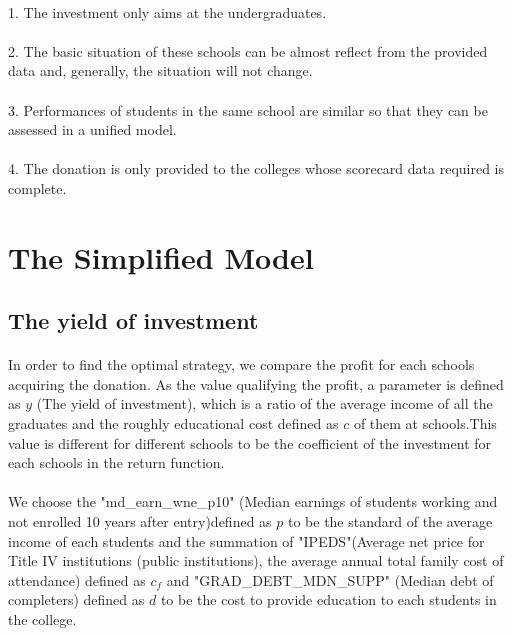 \documentclass{mcmthesis}
\begin{document}
\paragraph{} 1. The investment only aims at the undergraduates.
\paragraph{} 2. The basic situation of these schools can be almost reflect from the provided data and, generally, the situation will not change.
\paragraph{} 3. Performances of students in the same school are similar so that they can be assessed in a unified model.
\paragraph{} 4. The donation is only provided to the colleges whose scorecard data required is complete. 


\section{The Simplified Model}
\subsection{The yield of investment}  
\paragraph{} In order to find the optimal strategy, we compare the profit for each schools acquiring the donation. As the value qualifying the profit, a parameter is defined as $y$ (The yield of investment), which is a ratio of the average income of all the graduates and the roughly educational cost defined as $c$ of them at schools.This value is different for different schools to be the coefficient of the investment for each schools in the return function.
\paragraph{} We choose the "md\_earn\_wne\_p10" (Median earnings of students working and not enrolled 10 years after entry)defined as $p$ to be the standard of the average income of each students and the summation of "IPEDS"(Average net price for Title IV institutions (public institutions), the average annual total family cost of attendance) defined as $c_f$ and "GRAD\_DEBT\_MDN\_SUPP" (Median debt of completers) defined as $d$ to be the cost to provide education to each students in the college.
\end{document}

